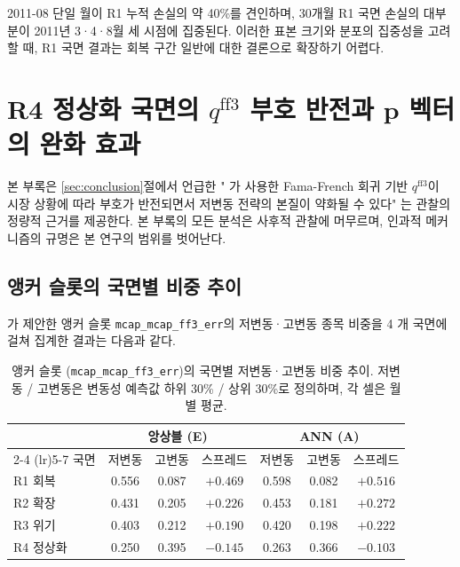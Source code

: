 \documentclass{article}
\begin{document}
2011-08 단일 월이 R1 누적 손실의 약 40\%를 견인하며, 30개월 R1 국면 손실의 대부분이 2011년 3·4·8월 세 시점에 집중된다. 이러한 표본 크기와 분포의 집중성을 고려할 때, R1 국면 결과는 회복 구간 일반에 대한 결론으로 확장하기 어렵다.

\section{R4 정상화 국면의 $q^{\mathrm{ff3}}$ 부호 반전과 $\mathbf{p}$ 벡터의 완화 효과}\label{app:r4_mechanism}

본 부록은 \ref{sec:conclusion}절에서 언급한 "\citet{pyo2018} 가 사용한 Fama-French 회귀 기반 $q^{\mathrm{ff3}}$이 시장 상황에 따라 부호가 반전되면서 저변동 전략의 본질이 약화될 수 있다" 는 관찰의 정량적 근거를 제공한다. 본 부록의 모든 분석은 사후적 관찰에 머무르며, 인과적 메커니즘의 규명은 본 연구의 범위를 벗어난다.

\subsection{앵커 슬롯의 국면별 비중 추이}

\citet{pyo2018}가 제안한 앵커 슬롯 \texttt{mcap\_mcap\_ff3\_err}의 저변동·고변동 종목 비중을 4 개 국면에 걸쳐 집계한 결과는 다음과 같다.

\begin{table}[ht]
\centering
\caption{앵커 슬롯 (\texttt{mcap\_mcap\_ff3\_err})의 국면별 저변동·고변동 비중 추이.
저변동 / 고변동은 변동성 예측값 하위 30\% / 상위 30\%로 정의하며, 각 셀은 월별 평균.}
\label{tab:r4_anchor_weights}
\setlength{\tabcolsep}{8pt}
\renewcommand{\arraystretch}{1.2}
\small
\begin{tabular}{lcccccc}
\toprule
& \multicolumn{3}{c}{앙상블 (E)} & \multicolumn{3}{c}{ANN (A)} \\
\cmidrule(lr){2-4} \cmidrule(lr){5-7}
국면 & 저변동 & 고변동 & 스프레드 & 저변동 & 고변동 & 스프레드 \\
\midrule
R1 회복   & 0.556 & 0.087 & $+0.469$          & 0.598 & 0.082 & $+0.516$          \\
R2 확장   & 0.431 & 0.205 & $+0.226$          & 0.453 & 0.181 & $+0.272$          \\
R3 위기   & 0.403 & 0.212 & $+0.190$          & 0.420 & 0.198 & $+0.222$          \\
R4 정상화 & 0.250 & 0.395 & $\mathbf{-0.145}$ & 0.263 & 0.366 & $\mathbf{-0.103}$ \\
\bottomrule
\end{tabular}
\end{table}
\end{document}
